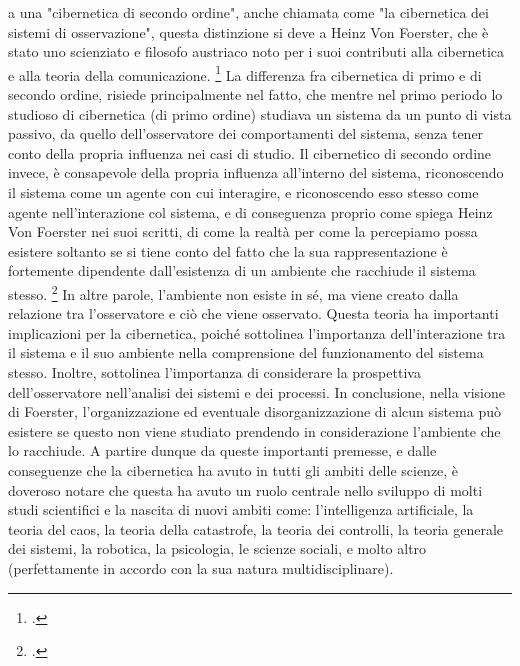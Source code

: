 a una "cibernetica di secondo ordine", anche chiamata come "la cibernetica dei sistemi di osservazione",
questa distinzione si deve a Heinz Von Foerster, 
che è stato uno scienziato e filosofo austriaco noto per i suoi contributi 
alla cibernetica e alla teoria della comunicazione. \footcite{scottsecondordercyb}
La differenza fra cibernetica di primo e di secondo ordine, risiede principalmente nel fatto,
che mentre   nel primo periodo lo studioso di cibernetica (di primo ordine)
studiava un sistema da un punto di vista passivo, da quello dell'osservatore
dei comportamenti del sistema, senza tener conto della propria influenza 
nei casi di studio.
Il  cibernetico di secondo ordine invece, è consapevole della propria 
influenza all'interno del sistema, riconoscendo il sistema come un agente con cui interagire, 
e riconoscendo esso stesso come agente nell'interazione col sistema, 
e di conseguenza proprio come spiega Heinz Von Foerster nei suoi scritti,
di come la realtà per come la percepiamo possa esistere
soltanto se si tiene conto del fatto che la sua rappresentazione è fortemente dipendente 
dall'esistenza di un ambiente che racchiude il sistema stesso. \footcite{understandingunderstanding}
In altre parole, l'ambiente non esiste in sé, ma viene creato dalla relazione 
tra l'osservatore e ciò che viene osservato.
Questa teoria ha importanti implicazioni per la cibernetica, 
poiché sottolinea l'importanza dell'interazione tra il sistema e il suo ambiente 
nella comprensione del funzionamento del sistema stesso. 
Inoltre, sottolinea l'importanza di considerare la prospettiva 
dell'osservatore nell'analisi dei sistemi e dei processi.
In conclusione, nella visione di Foerster, 
l'organizzazione ed eventuale disorganizzazione di alcun sistema può esistere 
se questo non viene studiato prendendo in considerazione l'ambiente che lo racchiude.
A partire dunque da queste importanti premesse, e dalle conseguenze 
che la cibernetica ha avuto in tutti gli ambiti delle scienze, è doveroso 
notare che questa ha avuto un ruolo centrale nello sviluppo di
molti studi scientifici e la nascita
di nuovi ambiti come: l'intelligenza artificiale, la teoria del caos,
la teoria della catastrofe,
la teoria dei controlli, la teoria generale dei sistemi, la robotica,
la psicologia, le scienze sociali, e molto altro 
(perfettamente in accordo con la sua natura multidisciplinare).


